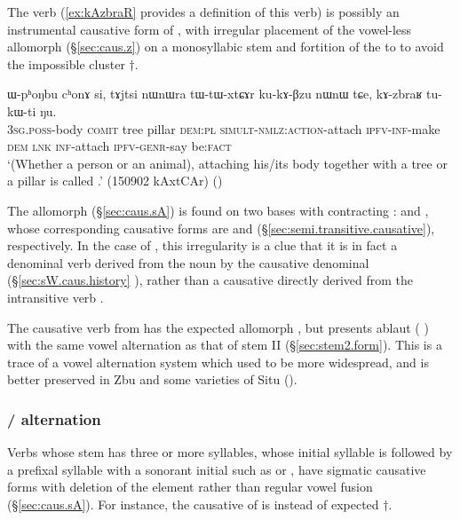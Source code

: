 The verb  (\ref{ex:kAzbraR} provides a definition of this verb) is possibly an instrumental causative form of , with irregular placement of the vowel-less allomorph  (§\ref{sec:caus.z}) on a monosyllabic stem and fortition of the  to  to avoid the impossible cluster $\dagger$.

\begin{exe} 
\ex \label{ex:kAzbraR}
\gll ɯ-pʰoŋbu cʰonɤ si, tɤjtsi nɯnɯra tɯ-tɯ-xtɕɤr ku-kɤ-βzu nɯnɯ tɕe, kɤ-zbraʁ tu-kɯ-ti ŋu.  \\
\textsc{3sg}.\textsc{poss}-body \textsc{comit} tree pillar \textsc{dem}:\textsc{pl}  \textsc{simult}-\textsc{nmlz}:\textsc{action}-attach \textsc{ipfv}-\textsc{inf}-make \textsc{dem} \textsc{lnk} \textsc{inf}-attach \textsc{ipfv}-\textsc{genr}-say be:\textsc{fact} \\
\glt `(Whether a person or an animal), attaching his/its body together with a tree or a pillar is called .' (150902 kAxtCAr)
()
\end{exe}
 
The  allomorph (§\ref{sec:caus.sA}) is found on two bases with contracting :  and , whose corresponding causative forms are   and  (§\ref{sec:semi.transitive.causative}), respectively. In the case of , this irregularity is a clue that it is in fact a denominal verb derived from the noun  by the causative denominal (§\ref{sec:sW.caus.history} ), rather than a causative directly derived from the intransitive verb .

 The causative verb  from  has the expected allomorph , but presents ablaut ( \fl{} ) with the same vowel alternation as that of stem II (§\ref{sec:stem2.form}). This is a trace of a vowel alternation system which used to be more widespread, and is better preserved in Zbu \citep{gong18these} and some varieties of Situ (\citealt[304, fn 10]{zhangsy18stem}).

  \subsubsection{/ alternation} \label{sec:sigm.caus.a.z}
Verbs whose stem has three or more syllables, whose initial syllable is  followed by a prefixal syllable with a sonorant initial such as  or , have sigmatic causative forms with deletion of the  element rather than regular vowel fusion (§\ref{sec:caus.sA}). For instance, the causative of  is  instead of expected $\dagger$.

